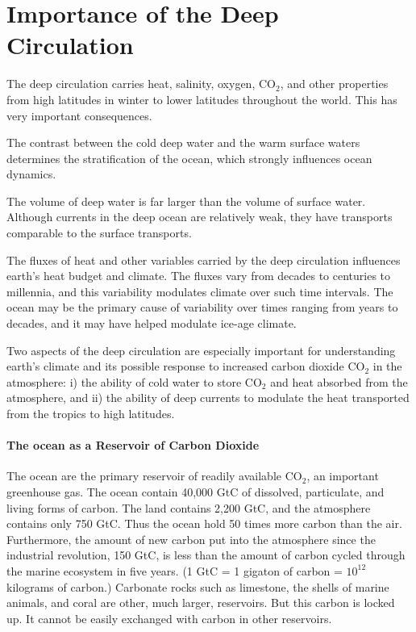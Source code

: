 \section{Importance of the Deep Circulation}
The deep circulation carries heat,
salinity, oxygen, CO$_2$, and other properties from high latitudes in
winter to lower latitudes throughout the world. This has very
important consequences.

\begin{enumerate}
\vitem The contrast between the cold deep water and the warm surface
waters determines the stratification of the ocean, which strongly
influences ocean dynamics.

\vitem The volume of deep water is far larger than the volume of
surface water. Although currents in the deep ocean are relatively
weak, they have transports
comparable to the surface transports.

\vitem The fluxes of heat and other variables carried by the deep
circulation influences earth's heat budget and climate. The fluxes
vary from decades to centuries to millennia, and this variability
modulates climate over such time intervals. The ocean may be the
primary cause of variability over times ranging from years to decades,
and it may have helped modulate ice-age climate.

\end{enumerate}
Two aspects of the deep circulation are especially important for
understanding earth's climate and its possible response to increased
carbon dioxide CO$_2$ in the atmosphere: i) the ability of cold water
to store CO$_2$ and heat absorbed from the atmosphere, and ii) the
ability of deep currents to modulate the heat
transported from the tropics to high latitudes.

\paragraph{The ocean as a Reservoir of Carbon Dioxide}
The ocean are the primary reservoir of readily
available CO$_2$, an important greenhouse gas. The ocean contain
40,000 GtC of dissolved, particulate, and living forms of carbon. The
land contains 2,200 GtC, and the atmosphere contains only 750
GtC. Thus the ocean hold 50 times more carbon than the
air. Furthermore, the amount of new carbon put into the atmosphere
since the industrial revolution, 150 GtC, is less than the amount of
carbon cycled through the marine ecosystem in five years. (1 GtC = 1
gigaton of carbon = $10^{12}$ kilograms of carbon.) Carbonate rocks
such as limestone, the shells of marine animals, and coral are other,
much larger, reservoirs. But this carbon is locked up. It cannot be
easily exchanged with carbon in other reservoirs.

